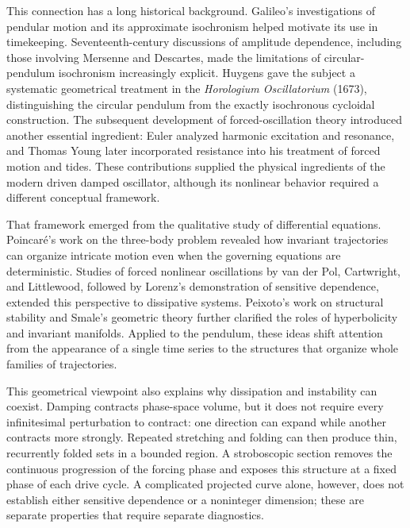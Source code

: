\documentclass[aps,prb,reprint,floatfix]{revtex4-2}
\begin{document}
This connection has a long historical background. Galileo's investigations of pendular motion and its approximate isochronism helped motivate its use in timekeeping. Seventeenth-century discussions of amplitude dependence, including those involving Mersenne and Descartes, made the limitations of circular-pendulum isochronism increasingly explicit. Huygens gave the subject a systematic geometrical treatment in the \textit{Horologium Oscillatorium} (1673), distinguishing the circular pendulum from the exactly isochronous cycloidal construction.\cite{Buyse2017,Huygens1673,Matthews2000} The subsequent development of forced-oscillation theory introduced another essential ingredient: Euler analyzed harmonic excitation and resonance, and Thomas Young later incorporated resistance into his treatment of forced motion and tides.\cite{Bistafa2021,Bistafa2022,Young1813,Young1824,Bleck2018} These contributions supplied the physical ingredients of the modern driven damped oscillator, although its nonlinear behavior required a different conceptual framework.

That framework emerged from the qualitative study of differential equations. Poincar\'e's work on the three-body problem revealed how invariant trajectories can organize intricate motion even when the governing equations are deterministic.\cite{Poincare1890,BarrowGreen1997} Studies of forced nonlinear oscillations by van der Pol, Cartwright, and Littlewood, followed by Lorenz's demonstration of sensitive dependence, extended this perspective to dissipative systems.\cite{VanderPol1927,CartwrightLittlewood1945,Lorenz1963} Peixoto's work on structural stability and Smale's geometric theory further clarified the roles of hyperbolicity and invariant manifolds.\cite{Peixoto1959,Peixoto1962,Smale1960,Smale1967} Applied to the pendulum, these ideas shift attention from the appearance of a single time series to the structures that organize whole families of trajectories.

This geometrical viewpoint also explains why dissipation and instability can coexist. Damping contracts phase-space volume, but it does not require every infinitesimal perturbation to contract: one direction can expand while another contracts more strongly. Repeated stretching and folding can then produce thin, recurrently folded sets in a bounded region. A stroboscopic section removes the continuous progression of the forcing phase and exposes this structure at a fixed phase of each drive cycle. A complicated projected curve alone, however, does not establish either sensitive dependence or a noninteger dimension; these are separate properties that require separate diagnostics.
\end{document}
